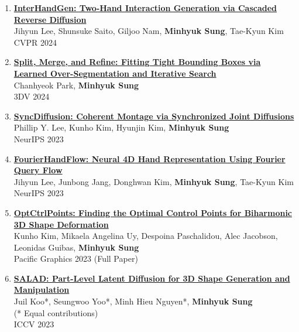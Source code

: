\documentclass[letterpaper,10pt]{article} %
\newcommand{\blankline}{\quad\pagebreak[2]}
\begin{document}
\begin{enumerate}
\item \label{cvpr24_1}
\href{https://arxiv.org/abs/2403.17422}{\textbf{InterHandGen: Two-Hand Interaction Generation via Cascaded Reverse Diffusion}}\\
Jihyun Lee, Shunsuke Saito, Giljoo Nam, \textbf{Minhyuk Sung}, Tae-Kyun Kim\\
CVPR 2024\\
\blankline

\item \label{3dv24}
\href{https://arxiv.org/abs/2304.04336}{\textbf{Split, Merge, and Refine: Fitting Tight Bounding Boxes via Learned Over-Segmentation and Iterative Search}}\\
Chanhyeok Park, \textbf{Minhyuk Sung}\\
3DV 2024\\
\blankline

\item \label{neurips23_2}
\href{https://arxiv.org/abs/2306.05178}{\textbf{SyncDiffusion: Coherent Montage via Synchronized Joint Diffusions}}\\
Phillip Y. Lee, Kunho Kim, Hyunjin Kim, \textbf{Minhyuk Sung}\\
NeurIPS 2023\\
\blankline

\item \label{neurips23_1}
\href{https://arxiv.org/abs/2307.08100}{\textbf{FourierHandFlow: Neural 4D Hand Representation Using Fourier Query Flow}}\\
Jihyun Lee, Junbong Jang, Donghwan Kim, \textbf{Minhyuk Sung}, Tae-Kyun Kim\\
NeurIPS 2023\\
\blankline

\item \label{pg23}
\href{https://arxiv.org/abs/2309.12899}{\textbf{OptCtrlPoints: Finding the Optimal Control Points for Biharmonic 3D Shape Deformation}}\\
Kunho Kim, Mikaela Angelina Uy, Despoina Paschalidou, Alec Jacobson, Leonidas Guibas, \textbf{Minhyuk Sung}\\
Pacific Graphics 2023 (Full Paper)\\
\blankline

\item \label{iccv23}
\href{https://arxiv.org/abs/2303.12236}{\textbf{SALAD: Part-Level Latent Diffusion for 3D Shape Generation and Manipulation}}\\
Juil Koo*, Seungwoo Yoo*, Minh Hieu Nguyen*, \textbf{Minhyuk Sung}\\
(* Equal contributions)\\
ICCV 2023\\
\blankline


\end{enumerate}
\end{document}
